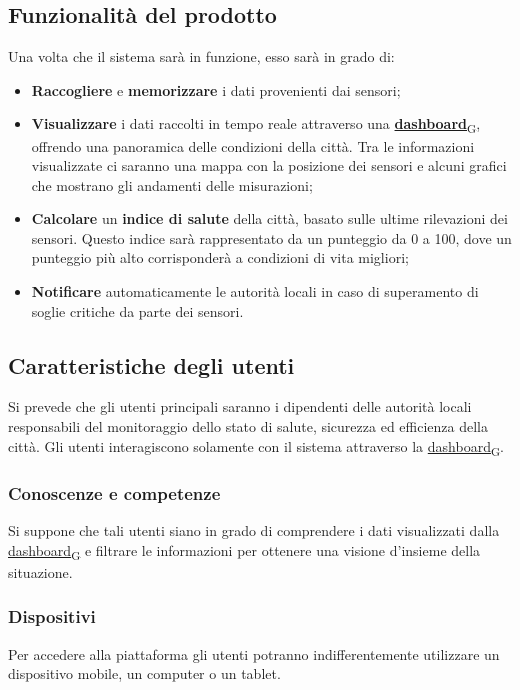 \subsection{Funzionalità del prodotto}
Una volta che il sistema sarà in funzione, esso sarà in grado di:
\begin{itemize}
	\item \textbf{Raccogliere} e \textbf{memorizzare} i dati provenienti dai sensori;
	\item \textbf{Visualizzare} i dati raccolti in tempo reale attraverso una \href{https://7last.github.io/docs/rtb/documentazione-interna/glossario\#dashboard}{\textbf{dashboard}\textsubscript{G}}, offrendo una panoramica delle condizioni della città.
	      Tra le informazioni visualizzate ci saranno una mappa con la posizione dei sensori e alcuni grafici che mostrano gli andamenti delle misurazioni;
	\item \textbf{Calcolare} un \textbf{indice di salute} della città, basato sulle ultime rilevazioni dei sensori. Questo indice sarà rappresentato da un punteggio da 0 a 100, dove un punteggio più alto corrisponderà a condizioni di vita migliori;
	\item \textbf{Notificare} automaticamente le autorità locali in caso di superamento di soglie critiche da parte dei sensori.
\end{itemize}

\subsection{Caratteristiche degli utenti}
Si prevede che gli utenti principali saranno i dipendenti delle autorità locali responsabili
del monitoraggio dello stato di salute, sicurezza ed efficienza della città.
Gli utenti interagiscono solamente con il sistema attraverso la \href{https://7last.github.io/docs/rtb/documentazione-interna/glossario\#dashboard}{dashboard\textsubscript{G}}.

\subsubsection{Conoscenze e competenze}
Si suppone che tali utenti siano in grado di comprendere i dati visualizzati dalla \href{https://7last.github.io/docs/rtb/documentazione-interna/glossario\#dashboard}{dashboard\textsubscript{G}} e filtrare le informazioni
per ottenere una visione d'insieme della situazione.

\subsubsection{Dispositivi}
Per accedere alla piattaforma gli utenti potranno indifferentemente utilizzare un dispositivo mobile, un computer o un tablet.






